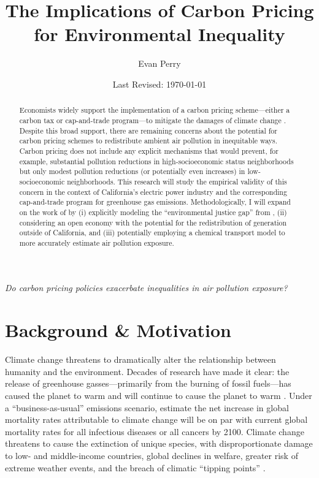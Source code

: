 \documentclass[11pt]{article}
\title{The Implications of Carbon Pricing for Environmental Inequality}
\author{Evan Perry}
\date{Last Revised: \today}
\begin{document}
\maketitle
 
\begin{center}
	\emph{Do carbon pricing policies exacerbate inequalities in air pollution exposure?}
\end{center}

\renewcommand{\abstractname}{Summary}
\begin{abstract}\normalsize
\noindent 
Economists widely support the implementation of a carbon pricing scheme---either a carbon tax or cap-and-trade program---to mitigate the damages of climate change \citep{climate_letter}. 
Despite this broad support, there are remaining concerns about the potential for carbon pricing schemes to redistribute ambient air pollution in inequitable ways. Carbon pricing does not include any explicit mechanisms that would prevent, for example, substantial pollution reductions in high-socioeconomic status neighborhoods but only modest pollution reductions (or potentially even increases) in low-socioeconomic neighborhoods. This research will study the empirical validity of this concern in the context of California's electric power industry and the corresponding cap-and-trade program for greenhouse gas emissions. Methodologically, I will expand on the work of \cite{weber2021dynamic} by (i) explicitly modeling the ``environmental justice gap'' from \cite{hernandez2023environmental}, (ii) considering an open economy with the potential for the redistribution of generation outside of California, and (iii) potentially employing a chemical transport model to more accurately estimate air pollution exposure.
\end{abstract}

\doublespacing
\section*{Background \& Motivation}

Climate change threatens to dramatically alter the relationship between humanity and the environment. Decades of research have made it clear: the release of greenhouse gasses---primarily from the burning of fossil fuels---has caused the planet to warm and will continue to cause the planet to warm \citep{ipcc6_1}. Under a ``business-as-usual'' emissions scenario, \cite{carleton2022} estimate the net increase in global mortality rates attributable to climate change will be on par with current global mortality rates for all infectious diseases or all cancers by 2100. Climate change threatens to cause the extinction of unique species, with disproportionate damage to low- and middle-income countries, global declines in welfare, greater risk of extreme weather events, and the breach of climatic ``tipping points'' \citep{ipcc6_2}.
\end{document}
